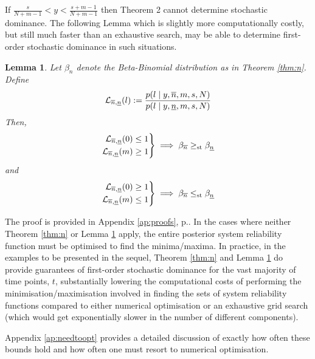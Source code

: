 \documentclass[12pt, a4paper]{elsarticle}
\newtheorem{lemma}[theorem]{Lemma}
\begin{document}
If $\frac{s}{N + m - 1} < y < \frac{s + m - 1}{N + m - 1}$ then 
Theorem 2 cannot determine stochastic dominance.  The following Lemma which is slightly
more computationally costly, but still much faster than an exhaustive search, may be able to determine first-order
stochastic dominance in such situations.
\begin{lemma}
  \label{lem:n}
  Let $\beta_n$ denote the Beta-Binomial distribution as in Theorem \ref{thm:n}.  Define
  \[ \mathcal{L}_{\overline{n},\underline{n}}(l) := \frac{p(l \mid y, \overline{n}, m, s, N)}{p(l \mid y, \underline{n}, m, s, N)} \]
  Then,
  \[ \left. \begin{aligned}
       \mathcal{L}_{\overline{n},\underline{n}}(0) \le 1 \\
       \mathcal{L}_{\overline{n},\underline{n}}(m) \ge 1 \\
    \end{aligned} \right\}
    \implies \beta_{\overline{n}} \ge_{\mathrm{st}} \beta_{\underline{n}} \]
  and
  \[ \left. \begin{aligned}
       \mathcal{L}_{\overline{n},\underline{n}}(0) \ge 1 \\
       \mathcal{L}_{\overline{n},\underline{n}}(m) \le 1 \\
    \end{aligned} \right\}
    \implies \beta_{\overline{n}} \le_{\mathrm{st}} \beta_{\underline{n}} \]
\end{lemma}
The proof is provided in Appendix \ref{ap:proofs}, p.\pageref{prf:n2}.
In the cases where neither Theorem \ref{thm:n} or Lemma \ref{lem:n} apply,
the entire posterior system reliability function must be optimised to 
find the minima/maxima.
In practice, in the examples to be presented in the sequel, Theorem 
\ref{thm:n} and Lemma \ref{lem:n} do provide guarantees of first-order
stochastic dominance for the vast majority of time points, $t$,
substantially lowering the computational costs of performing the
minimisation/maximisation involved in finding the sets of system 
reliability functions compared to either numerical optimisation or
an exhaustive grid search (which would get exponentially slower in 
the number of different components).

Appendix \ref{ap:needtoopt} provides a detailed discussion of exactly how often these bounds hold and how often one must resort to numerical optimisation.
\end{document}
